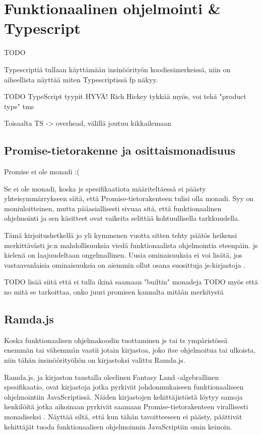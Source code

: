 \section{Funktionaalinen ohjelmointi \& Typescript}


TODO

Typescriptiä tullaan käyttämään insinöörityön koodiesimerkeissä, niin on aiheellista näyttää miten Typescriptissä \gls{fp} näkyy.

TODO TypeScript tyypit HYVÄ! Rich Hickey tykkää myös, voi tehä "product type" tms

Toisaalta TS -> overhead, välillä joutuu kikkailemaan

\subsection{Promise-tietorakenne ja osittaismonadisuus}

Promise ei ole monadi :( \cite{read-it-later-11481,promises-spec-94}

Se ei ole monadi, koska \gls{js} spesifikaatiota määriteltäessä ei päästy yhteisymmärrykseen siitä, että Promise-tietorakenteen tulisi olla monadi. Syy on moniuloitteinen, mutta pääasiallisesti sivuaa sitä, että funktionaalinen ohjelmointi ja sen käsitteet ovat vaikeita selittää kohtuullisella tarkkuudella. \citep{promises-spec-94}

Tämä kirjoitushetkellä jo yli kymmenen vuotta sitten tehty päätös heikensi merkittävästi \gls{js}:n mahdollisuuksia viedä funktionaalista ohjelmointia eteenpäin. \Gls{js} kielenä on laajuudeltaan ongelmallinen. Uusia ominaisuuksia ei voi lisätä, jos vastaavanlaisia ominaisuuksia on aiemmin ollut osana suosittuja \gls{js}-kirjastoja \cite{proposal-joint-iteration,prototype_library_trends}.

TODO lisää siitä että ei tulla ikinä saamaan "builtin" monadeja
TODO myös että no mitä se tarkoittaa, onko juuri promisen kannalta mitään merkitystä

\subsection{Ramda.js}

Koska funktionaalisen ohjelmakoodin tuottaminen \gls{js} tai \gls{ts} ympäristössä enemmän tai vähemmän vaatii jotain kirjastoa, joko itse ohjelmoitua tai ulkoista, niin tähän insinöörityöhön on kirjastoksi valittu Ramda.js.

Ramda.js, ja kirjaston taustalla oleelinen Fantasy Land -algebrallinen spesifikaatio, ovat kirjastoja jotka pyrkivät johdonmukaiseen funktionaaliseen ohjelmointiin JavaScriptissä. Näiden kirjastojen kehittäjistöstä löytyy samoja henkilöitä jotka aikoinaan pyrkivät saamaan Promise-tietorakenteen virallisesti monadiseksi \cite{ramda:contributors,fantasy-land:contributors,promises-spec-94}. Näyttää siltä, että kun tähän tavoitteeseen ei päästy, päättivät kehittäjät tuoda funktionaalisen ohjelmoinnin JavaScriptiin omin keinoin.


